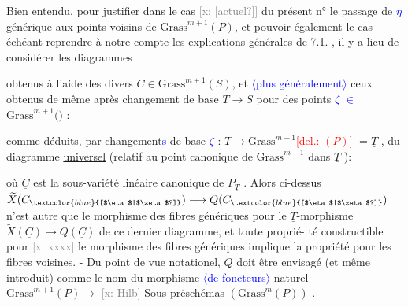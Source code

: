 \documentclass[11pt]{article}
\newcommand{\scanpage}[1]{\par\bigskip\noindent{\small\sffamily[scan #1]}\par}
\newcommand{\mspage}[1]{{\small\sffamily[p.\,#1]}}
\newcommand{\hand}[1]{\textcolor{blue}{#1}}
\let\over\relax
\newcommand{\over}[2]{\textcolor{gray}{#1}\textcolor{blue}{\ensuremath{^{\!\nearrow}}#2}}
\newcommand{\inserted}[2][]{\textcolor{blue}{$\langle$#2$\rangle$}}
\newcommand{\deleted}[1]{\textcolor{red}{[\textsf{del.:} #1]}}
\newcommand{\xout}[1]{\textcolor{gray}{[\textsf{x:} #1]}}
\newcommand{\uline}[1]{\underline{#1}}
\newcommand{\unsure}[1]{[#1?]}
\newenvironment{diagramblock}{\par\begin{center}}{\end{center}\par}
\begin{document}
\mspage{90}

\clearpage
\scanpage{25/91}
\mspage{85}

Bien entendu, pour justifier dans le cas \xout{\unsure{actuel}} du présent n° le passage
de \hand{$\eta$} générique aux points voisins de $\mathrm{Grass}^{m+1}(P)$, et pouvoir également
le cas échéant reprendre à notre compte les explications générales de
7.1. , il y a lieu de considérer les diagrammes
\begin{diagramblock}\end{diagramblock}
obtenus à l'aide des divers $C \in \mathrm{Grass}^{m+1}(S)$, et \inserted{plus généralement} ceux obtenus de même
après changement de base $T \to S$ pour des points \hand{$\zeta$} \hand{$\in$} $\mathrm{Grass}^{m+1}($\over{P}{\unsure{T}}$)$ :
\begin{diagramblock}\end{diagramblock}
comme déduits, par changement\hand{s} de base \hand{$\zeta$} : $T \longrightarrow \mathrm{Grass}^{m+1}$\deleted{$(P)$} $= \underline{T}$ ,
du diagramme \uline{universel} (relatif au point canonique de $\mathrm{Grass}^{m+1}$ dans $\underline{T}$ ):
\begin{diagramblock}\end{diagramblock}
où $\underline{C}$ est la sous-variété linéaire canonique de $P_{\underline{T}}$ . Alors ci-dessus
$\widetilde{X}(C_{\hand{\unsure{$\eta$|$\zeta$}}}) \longrightarrow Q(C_{\hand{\unsure{$\eta$|$\zeta$}}})$ n'est autre que le morphisme des fibres génériques pour
le $\underline{T}$-morphisme $\widetilde{X}(\underline{C}) \longrightarrow Q(\underline{C})$ de ce dernier diagramme, et toute propri\'e-%
té constructible pour \xout{xxxx} le morphisme des fibres génériques implique
la propriété pour les fibres voisines. - Du point de vue notationel,
$Q$ doit être envisagé (et même introduit) comme le nom du morphisme \inserted{de foncteurs}
naturel $\mathrm{Grass}^{m+1}(P) \longrightarrow$ \xout{Hilb} Sous-préschémas $(\mathrm{Grass}^{m}(P))$ .
\end{document}
